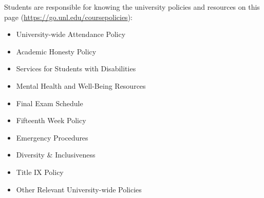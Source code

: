 \documentclass[10pt]{article}
\begin{document}
Students are responsible for knowing the university policies and resources on this page (\href{https://go.unl.edu/coursepolicies}{https://go.unl.edu/coursepolicies}):

\begin{itemize}
    \item University-wide Attendance Policy
    \item Academic Honesty Policy
    \item Services for Students with Disabilities
    \item Mental Health and Well-Being Resources
    \item Final Exam Schedule
    \item Fifteenth Week Policy
    \item Emergency Procedures
    \item Diversity \& Inclusiveness
    \item Title IX Policy
    \item Other Relevant University-wide Policies
\end{itemize}
\end{document}

